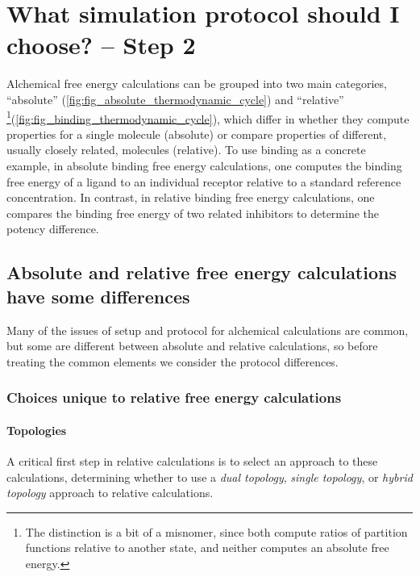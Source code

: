 \documentclass[9pt,bestpractices]{livecoms}
\begin{document}
%
%
%
%
\section{What simulation protocol should I choose? -- Step 2}
\label{sec:step2}
Alchemical free energy calculations can be grouped into two main categories, ``absolute'' (\ref{fig:fig_absolute_thermodynamic_cycle}) and ``relative'' \footnote{The distinction is a bit of a misnomer, since both compute ratios of partition functions relative to another state, and neither computes an absolute free energy.}(\ref{fig:fig_binding_thermodynamic_cycle}), which differ in whether they compute properties for a single molecule (absolute) or compare properties of different, usually closely related, molecules (relative).
To use binding as a concrete example, in absolute binding free energy calculations, one computes the binding free energy of a ligand to an individual receptor relative to a standard reference concentration.
In contrast, in relative binding free energy calculations, one compares the binding free energy of two related inhibitors to determine the potency difference.
\subsection*{Absolute and relative free energy calculations have some differences}
Many of the issues of setup and protocol for alchemical calculations are common, but some are different between absolute and relative calculations, so before treating the common elements we consider the protocol differences.

\subsubsection*{Choices unique to relative free energy calculations}

\paragraph{Topologies} A critical first step in relative calculations is to select an approach to these calculations, determining whether to use a \emph{dual topology}, \emph{single topology}, or \emph{hybrid topology} approach to relative calculations.
\end{document}
